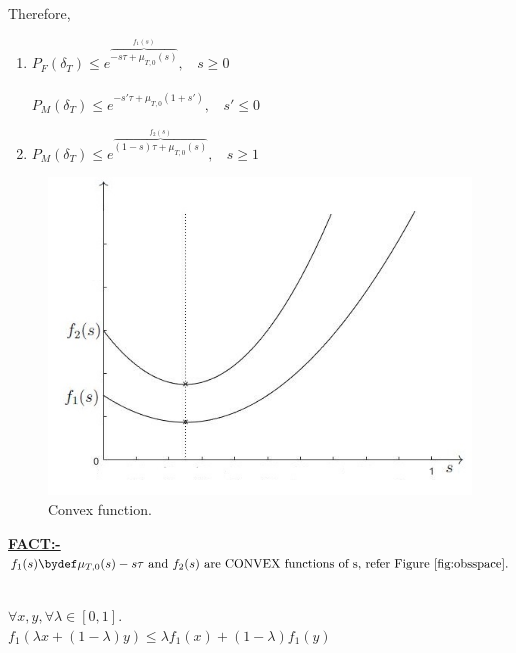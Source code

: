 \documentclass[12pt]{report}
\begin{document}
Therefore,
\begin{enumerate}\bfseries
\item $P_F(\delta_T)\leqslant {e^{\overbrace{-s\tau + \mu_{T,0}(s)}^{f_1(s)}}}, \ \ \ \ s\geqslant 0$ \\\\$P_M(\delta_T)\leqslant e^{-s'\tau + \mu_{T,0}(1+s')},\ \ \ \ s'\leqslant 0$
\item $P_M(\delta_T)\leqslant e^{\overbrace{(1-s)\tau + \mu_{T,0}(s)}^{f_2(s)}}, \ \ \ \ s\geqslant 1$
\end{enumerate}

\begin{figure}[h]
\centering
\includegraphics[scale=0.5]{Figures/Convex1}
\caption{Convex function.}
\label{fig:obsspace}
\end{figure}


\noindent \textbf{\underline{FACT:-}} \nonumber $f_1(s)  \bydef \mu_{T,0}(s)-s\tau \text{ and } f_2(s) \text{ are CONVEX functions of s, refer Figure \ref{fig:obsspace}.}$\\
\\
\begin{center}
$\forall x,y, \forall \lambda \in [0,1].$\\
$f_1(\lambda x + (1- \lambda)y)\le \lambda f_1(x)+(1-\lambda)f_1(y)$\\
\end{center}

	
\end{document}

